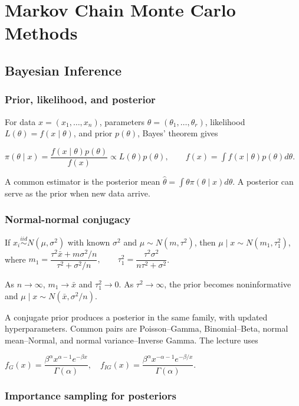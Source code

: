\section{Markov Chain Monte Carlo Methods}

\subsection{Bayesian Inference}

\subsubsection*{Prior, likelihood, and posterior}

For data $x=(x_1,\ldots,x_n)$, parameters $\theta=(\theta_1,\ldots,\theta_r)$, likelihood $L(\theta)=f(x\mid\theta)$, and prior $p(\theta)$, Bayes' theorem gives

$\pi(\theta\mid x)=\dfrac{f(x\mid\theta)p(\theta)}{f(x)}\propto L(\theta)p(\theta),\qquad f(x)=\int f(x\mid\theta)p(\theta)d\theta$.

A common estimator is the posterior mean $\hat\theta=\int\theta\pi(\theta\mid x)d\theta$. A posterior can serve as the prior when new data arrive.

\subsubsection*{Normal-normal conjugacy}

If $x_i\stackrel{iid}{\sim}N(\mu,\sigma^2)$ with known $\sigma^2$ and $\mu\sim N(m,\tau^2)$, then $\mu\mid x\sim N(m_1,\tau_1^2)$, where
$m_1=\dfrac{\tau^2\bar x+m\sigma^2/n}{\tau^2+\sigma^2/n},\qquad \tau_1^2=\dfrac{\tau^2\sigma^2}{n\tau^2+\sigma^2}$.

As $n\to\infty$, $m_1\to\bar x$ and $\tau_1^2\to0$. As $\tau^2\to\infty$, the prior becomes noninformative and $\mu\mid x\sim N(\bar x,\sigma^2/n)$.

A conjugate prior produces a posterior in the same family, with updated hyperparameters. Common pairs are Poisson--Gamma, Binomial--Beta, normal mean--Normal, and normal variance--Inverse Gamma. The lecture uses

$f_G(x)=\dfrac{\beta^\alpha x^{\alpha-1}e^{-\beta x}}{\Gamma(\alpha)},\quad f_{IG}(x)=\dfrac{\beta^\alpha x^{-\alpha-1}e^{-\beta/x}}{\Gamma(\alpha)}$.

\subsubsection*{Importance sampling for posteriors}

